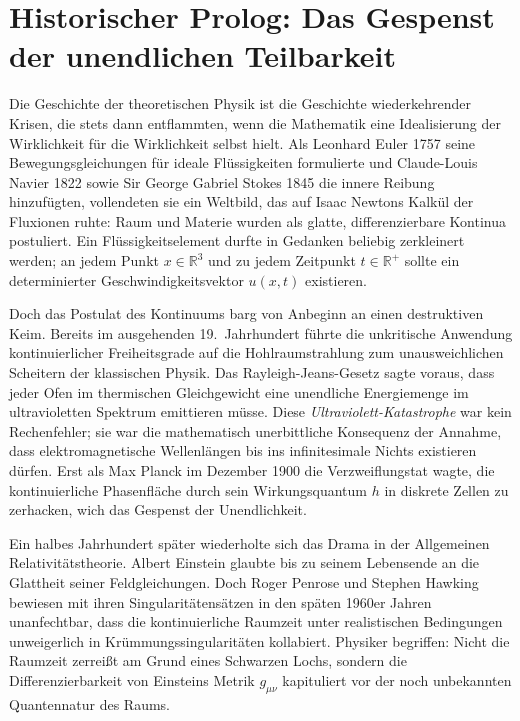 \documentclass[11pt,a4paper]{article}
\begin{document}
\newpage

\section{Historischer Prolog: Das Gespenst der unendlichen Teilbarkeit}

Die Geschichte der theoretischen Physik ist die Geschichte wiederkehrender Krisen, die stets dann entflammten, wenn die Mathematik eine Idealisierung der Wirklichkeit für die Wirklichkeit selbst hielt. Als Leonhard Euler 1757 seine Bewegungsgleichungen für ideale Flüssigkeiten formulierte und Claude-Louis Navier 1822 sowie Sir George Gabriel Stokes 1845 die innere Reibung hinzufügten, vollendeten sie ein Weltbild, das auf Isaac Newtons Kalkül der Fluxionen ruhte: Raum und Materie wurden als glatte, differenzierbare Kontinua postuliert. Ein Flüssigkeitselement durfte in Gedanken beliebig zerkleinert werden; an jedem Punkt $x \in \mathbb{R}^3$ und zu jedem Zeitpunkt $t \in \mathbb{R}^+$ sollte ein determinierter Geschwindigkeitsvektor $u(x,t)$ existieren.

Doch das Postulat des Kontinuums barg von Anbeginn an einen destruktiven Keim. Bereits im ausgehenden 19.~Jahrhundert führte die unkritische Anwendung kontinuierlicher Freiheitsgrade auf die Hohlraumstrahlung zum unausweichlichen Scheitern der klassischen Physik. Das Rayleigh-Jeans-Gesetz sagte voraus, dass jeder Ofen im thermischen Gleichgewicht eine unendliche Energiemenge im ultravioletten Spektrum emittieren müsse. Diese \emph{Ultraviolett-Katastrophe} war kein Rechenfehler; sie war die mathematisch unerbittliche Konsequenz der Annahme, dass elektromagnetische Wellenlängen bis ins infinitesimale Nichts existieren dürfen. Erst als Max Planck im Dezember 1900 die Verzweiflungstat wagte, die kontinuierliche Phasenfläche durch sein Wirkungsquantum $h$ in diskrete Zellen zu zerhacken, wich das Gespenst der Unendlichkeit.

Ein halbes Jahrhundert später wiederholte sich das Drama in der Allgemeinen Relativitätstheorie. Albert Einstein glaubte bis zu seinem Lebensende an die Glattheit seiner Feldgleichungen. Doch Roger Penrose und Stephen Hawking bewiesen mit ihren Singularitätensätzen in den späten 1960er Jahren unanfechtbar, dass die kontinuierliche Raumzeit unter realistischen Bedingungen unweigerlich in Krümmungssingularitäten kollabiert. Physiker begriffen: Nicht die Raumzeit zerreißt am Grund eines Schwarzen Lochs, sondern die Differenzierbarkeit von Einsteins Metrik $g_{\mu\nu}$ kapituliert vor der noch unbekannten Quantennatur des Raums.
\end{document}
